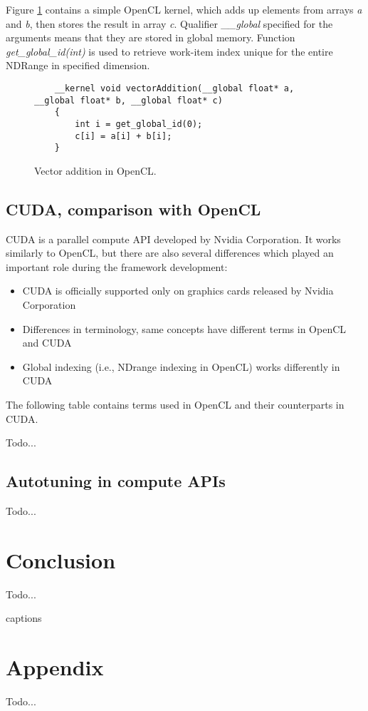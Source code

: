 \documentclass
[
    digital, %
    oneside, %
    table, %
    nolof, %
    nolot, %
    nocover %
]{fithesis3}
\begin{document}
Figure \ref{vector_addition} contains a simple OpenCL kernel, which adds up elements from arrays \textit{a} and \textit{b}, then stores the result in
array \textit{c}. Qualifier \textit{\_\_global} specified for the arguments means that they are stored in global memory. Function
\textit{get\_global\_id(int)} is used to retrieve work-item index unique for the entire NDRange in specified dimension.
\begin{figure}
    \begin{lstlisting}
    __kernel void vectorAddition(__global float* a, __global float* b, __global float* c)
    {
        int i = get_global_id(0);
        c[i] = a[i] + b[i];
    }
    \end{lstlisting}
    \caption{Vector addition in OpenCL.}
    \label{vector_addition}
\end{figure}

\section{CUDA, comparison with OpenCL}
CUDA is a parallel compute API developed by Nvidia Corporation. It works similarly to OpenCL, but there are also several differences which played an
important role during the framework development:
\begin{itemize}
    \item CUDA is officially supported only on graphics cards released by Nvidia Corporation
    \item Differences in terminology, same concepts have different terms in OpenCL and CUDA
    \item Global indexing (i.e., NDrange indexing in OpenCL) works differently in CUDA
\end{itemize}
The following table contains terms used in OpenCL and their counterparts in CUDA.

Todo...

\section{Autotuning in compute APIs}
Todo...

\chapter{Conclusion}
Todo...

\csname captions\languagename\endcsname
\makeatletter
\thesis@selectLocale{\thesis@locale}\makeatother
\printbibliography[heading=bibintoc]

\appendix
\chapter{Appendix}
Todo...
\end{document}
